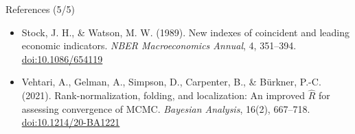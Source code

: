 \begin{frame}{References (5/5)}
\begin{itemize}
    \item Stock, J. H., \& Watson, M. W. (1989). New indexes of coincident and leading economic indicators. \textit{NBER Macroeconomics Annual}, 4, 351--394. \href{https://doi.org/10.1086/654119}{doi:10.1086/654119}
    \item Vehtari, A., Gelman, A., Simpson, D., Carpenter, B., \& Bürkner, P.-C. (2021). Rank-normalization, folding, and localization: An improved $\widehat{R}$ for assessing convergence of MCMC. \textit{Bayesian Analysis}, 16(2), 667--718. \href{https://doi.org/10.1214/20-BA1221}{doi:10.1214/20-BA1221}
\end{itemize}
\end{frame}


